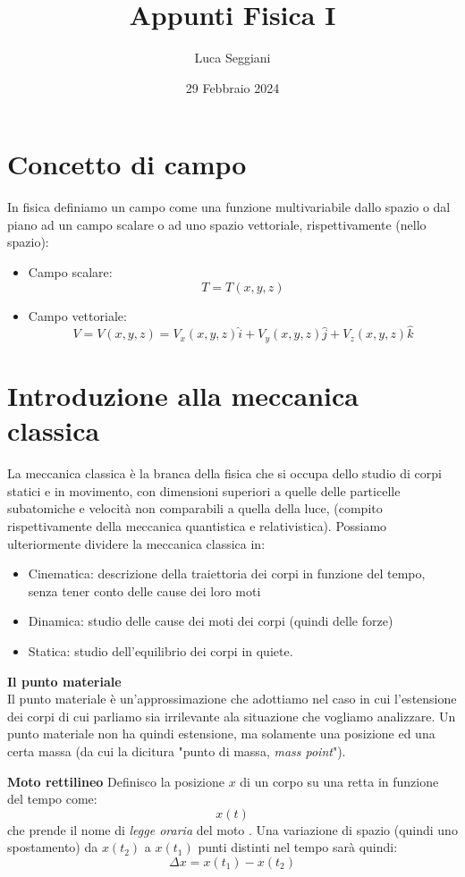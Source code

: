 \documentclass[a4paper,12pt]{article}
\title{Appunti Fisica I}
\author{Luca Seggiani}
\date{29 Febbraio 2024}
\begin{document}
\maketitle
\section{Concetto di campo}
In fisica definiamo un campo come una funzione multivariabile dallo spazio o dal piano ad un campo scalare
o ad uno spazio vettoriale, rispettivamente (nello spazio):
\begin{itemize}
  \item Campo scalare:
    $$ T = T(x, y, z) $$
  \item Campo vettoriale:
    $$ V = V(x, y, z) = V_x(x, y, z)\hat{i} + V_y(x, y, z)\hat{j} + V_z(x, y, z)\hat{k} $$
\end{itemize}

\section{Introduzione alla meccanica classica}
La meccanica classica è la branca della fisica che si occupa dello studio di corpi statici e in movimento,
con dimensioni superiori a quelle delle particelle subatomiche e velocità non comparabili a quella della luce,
(compito rispettivamente della meccanica quantistica e relativistica). Possiamo ulteriormente dividere la meccanica
classica in:
\begin{itemize}
  \item Cinematica:
    descrizione della traiettoria dei corpi in funzione del tempo, senza tener conto delle cause dei loro moti
  \item Dinamica:
    studio delle cause dei moti dei corpi (quindi delle forze)
  \item Statica:
    studio dell'equilibrio dei corpi in quiete.
\end{itemize}

\textbf{Il punto materiale} \\
Il punto materiale è un'approssimazione che adottiamo nel caso in cui l'estensione dei corpi di cui parliamo
sia irrilevante ala situazione che vogliamo analizzare. Un punto materiale non ha quindi estensione, ma solamente
una posizione ed una certa massa (da cui la dicitura "punto di massa,  \textit{mass point}").
\par \medskip
\textbf{Moto rettilineo}
Definisco la posizione $x$ di un corpo su una retta in funzione del tempo come:
$$ x(t) $$
che prende il nome di \textit{legge oraria} del moto .
Una variazione di spazio (quindi uno spostamento) da $x(t_2)$ a $x(t_1)$ punti distinti nel tempo sarà quindi:
$$ \Delta x = x(t_1)-x(t_2) $$
\end{document}
